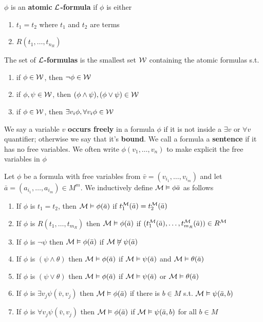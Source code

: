 \documentclass[11pt]{article}
\begin{document}
\begin{definition}[]
\(\phi\) is an \textbf{atomic} \textbf{\(\mathcal{L}\)-formula} if \(\phi\) is either
\begin{enumerate}
\item \(t_1=t_2\) where \(t_1\) and \(t_2\) are terms
\item \(R(t_1,\dots,t_{n_R})\)
\end{enumerate}


The set of \textbf{\(\mathcal{L}\)-formulas} is the smallest set \(\mathcal{W}\) containing the
atomic formulas s.t.
\begin{enumerate}
\item if \(\phi\in\mathcal{W}\), then \(\neg\phi\in\mathcal{W}\)
\item if \(\phi,\psi\in\mathcal{W}\), then \((\phi\wedge\psi),(\phi\vee\psi)\in\mathcal{W}\)
\item if \(\phi\in\mathcal{W}\), then \(\exists v_i\phi,\forall v_i\phi\in\mathcal{W}\)
\end{enumerate}
\end{definition}

We say a variable \(v\) \textbf{occurs freely} in a formula \(\phi\) if it is not
inside a \(\exists v\) or \(\forall v\) quantifier; otherwise we say that it's
\textbf{bound}. We call a formula a \textbf{sentence} if it has no free variables. We
often write \(\phi(v_1,\dots,v_n)\) to make explicit the free variables in \(\phi\)

\begin{definition}[]
Let \(\phi\) be a formula with free variables from
\(\bar{v}=(v_{i_1},\dots,v_{i_m})\)
 and let
 \(\bar{a}=(a_{i_1},\dots,a_{i_m})\in M^m\). We inductively define
 \(\mathcal{M}\vDash\phi\bar{a}\) as follows
\begin{enumerate}
\item If \(\phi\) is \(t_1=t_2\), then \(\mathcal{M}\vDash\phi(\bar{a})\) if
\(t_1^{\mathcal{M}}(\bar{a})=t_2^{\mathcal{M}}(\bar{a})\)
\item If \(\phi\) is \(R(t_1,\dots,t_{m_R})\) then \(\mathcal{M}\vDash\phi(\bar{a})\) if
\((t_1^{\mathcal{M}}(\bar{a}),\dots,t_{m_R}^{\mathcal{M}}(\bar{a}))\in R^{\mathcal{M}}\)
\item If \(\phi\) is \(\neg\psi\) then \(\mathcal{M}\vDash\phi(\bar{a})\) if
\(\mathcal{M}\not\vDash\psi(\bar{a})\)
\item If \(\phi\) is \((\psi\wedge\theta)\) then \(\mathcal{M}\vDash\phi(\bar{a})\) if
\(\mathcal{M}\vDash\psi(\bar{a})\) and
\(\mathcal{M}\vDash\theta(\bar{a})\)
\item If \(\phi\) is \((\psi\vee\theta)\) then \(\mathcal{M}\vDash\phi(\bar{a})\) if
\(\mathcal{M}\vDash\psi(\bar{a})\) or
\(\mathcal{M}\vDash\theta(\bar{a})\)
\item If \(\phi\) is \(\exists v_j\psi(\bar{v},v_j)\) then \(\mathcal{M}\vDash\phi(\bar{a})\)
if there is \(b\in M\) s.t. \(\mathcal{M}\vDash\psi(\bar{a},b)\)
\item If \(\phi\) is \(\forall v_j\psi(\bar{v},v_j)\) then \(\mathcal{M}\vDash\phi(\bar{a})\)
if \(\mathcal{M}\vDash\psi(\bar{a},b)\) for all \(b\in M\)
\end{enumerate}
\end{definition}
\end{document}
